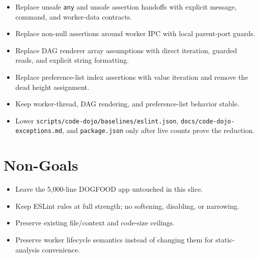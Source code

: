 \begin{itemize}
\tightlist
\item
  Replace unsafe \texttt{a\allowbreak{}n\allowbreak{}y} and unsafe assertion handoffs with explicit message, command, and worker-data contracts.
\item
  Replace non-null assertions around worker IPC with local parent-port guards.
\item
  Replace DAG renderer array assumptions with direct iteration, guarded reads, and explicit string formatting.
\item
  Replace preference-list index assertions with value iteration and remove the dead height assignment.
\item
  Keep worker-thread, DAG rendering, and preference-list behavior stable.
\item
  Lower \texttt{s\allowbreak{}c\allowbreak{}r\allowbreak{}i\allowbreak{}p\allowbreak{}t\allowbreak{}s\allowbreak{}/\allowbreak{}c\allowbreak{}o\allowbreak{}d\allowbreak{}e\allowbreak{}-\allowbreak{}d\allowbreak{}o\allowbreak{}j\allowbreak{}o\allowbreak{}/\allowbreak{}b\allowbreak{}a\allowbreak{}s\allowbreak{}e\allowbreak{}l\allowbreak{}i\allowbreak{}n\allowbreak{}e\allowbreak{}s\allowbreak{}/\allowbreak{}e\allowbreak{}s\allowbreak{}l\allowbreak{}i\allowbreak{}n\allowbreak{}t\allowbreak{}.\allowbreak{}j\allowbreak{}s\allowbreak{}o\allowbreak{}n}, \texttt{d\allowbreak{}o\allowbreak{}c\allowbreak{}s\allowbreak{}/\allowbreak{}c\allowbreak{}o\allowbreak{}d\allowbreak{}e\allowbreak{}-\allowbreak{}d\allowbreak{}o\allowbreak{}j\allowbreak{}o\allowbreak{}-\allowbreak{}e\allowbreak{}x\allowbreak{}c\allowbreak{}e\allowbreak{}p\allowbreak{}t\allowbreak{}i\allowbreak{}o\allowbreak{}n\allowbreak{}s\allowbreak{}.\allowbreak{}m\allowbreak{}d}, and \texttt{p\allowbreak{}a\allowbreak{}c\allowbreak{}k\allowbreak{}a\allowbreak{}g\allowbreak{}e\allowbreak{}.\allowbreak{}j\allowbreak{}s\allowbreak{}o\allowbreak{}n} only after live counts prove the reduction.
\end{itemize}

\section{Non-Goals}\label{record-218-non-goals}

\begin{itemize}
\tightlist
\item
  Leave the 5,000-line DOGFOOD app untouched in this slice.
\item
  Keep ESLint rules at full strength; no softening, disabling, or narrowing.
\item
  Preserve existing file/context and code-size ceilings.
\item
  Preserve worker lifecycle semantics instead of changing them for static-analysis convenience.
\end{itemize}

